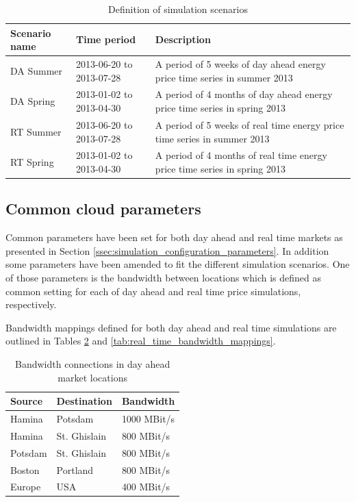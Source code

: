 \begin{table}[htbp]
\centering
\begin{tabularx}{\textwidth}{llX}
\toprule
  Scenario name & Time period & Description \\
\midrule
	DA Summer & 2013-06-20 to 2013-07-28 & A period of 5 weeks of day ahead energy price time series in summer 2013 \\
	DA Spring & 2013-01-02 to 2013-04-30 & A period of 4 months of day ahead energy price time series in spring 2013 \\
	RT Summer & 2013-06-20 to 2013-07-28 & A period of 5 weeks of real time energy price time series in summer 2013 \\
	RT Spring & 2013-01-02 to 2013-04-30 & A period of 4 months of real time energy price time series in spring 2013 \\
\bottomrule
\end{tabularx}
\caption{Definition of simulation scenarios}
\label{tab:simulation_scenarios}
\end{table}

\subsection{Common cloud parameters}

Common parameters have been set for both day ahead and real time markets as presented in Section \ref{ssec:simulation_configuration_parameters}. In addition some parameters have been amended to fit the different simulation scenarios. 
One of those parameters is the bandwidth between locations which is defined as common setting for each of day ahead and real time price simulations, respectively. 

Bandwidth mappings defined for both day ahead and real time simulations are outlined in Tables \ref{tab:day_ahead_bandwidth_mappings} and \ref{tab:real_time_bandwidth_mappings}. 


\begin{table}[htbp]
\centering
\begin{tabular}{lll}
\toprule
	Source & Destination & Bandwidth \\
\midrule
	Hamina & Potsdam & 1000 MBit/s \\
	Hamina & St. Ghislain & 800 MBit/s \\
	Potsdam & St. Ghislain & 800 MBit/s \\
	Boston & Portland & 800 MBit/s \\
	Europe & USA & 400 MBit/s \\
\bottomrule
\end{tabular}
\caption{Bandwidth connections in day ahead market locations}
\label{tab:day_ahead_bandwidth_mappings}
\end{table}



